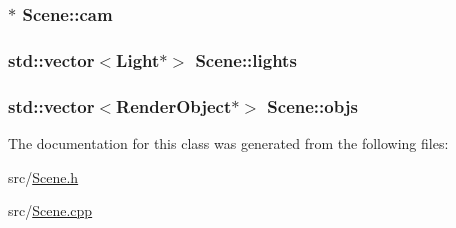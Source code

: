 \subsubsection[{\texorpdfstring{cam}{cam}}]{$\ast$ Scene\+::cam\hspace{0.3cm}{\ttfamily [private]}}\hypertarget{classScene_aeac676eac579e2831faae0eedaa8db8d}{}\label{classScene_aeac676eac579e2831faae0eedaa8db8d}
\subsubsection[{\texorpdfstring{lights}{lights}}]{\setlength{\rightskip}{0pt plus 5cm}std\+::vector$<${\bf Light}$\ast$$>$ Scene\+::lights\hspace{0.3cm}{\ttfamily [private]}}\hypertarget{classScene_a4ecc3182a80435e1c4dfbe1b20e559bd}{}\label{classScene_a4ecc3182a80435e1c4dfbe1b20e559bd}
\subsubsection[{\texorpdfstring{objs}{objs}}]{\setlength{\rightskip}{0pt plus 5cm}std\+::vector$<${\bf Render\+Object}$\ast$$>$ Scene\+::objs\hspace{0.3cm}{\ttfamily [private]}}\hypertarget{classScene_a37361b6054643b62fcb8e6b7c828e5dd}{}\label{classScene_a37361b6054643b62fcb8e6b7c828e5dd}


The documentation for this class was generated from the following files\+:\begin{DoxyCompactItemize}
\item 
src/\hyperlink{Scene_8h}{Scene.\+h}\item 
src/\hyperlink{Scene_8cpp}{Scene.\+cpp}\end{DoxyCompactItemize}
